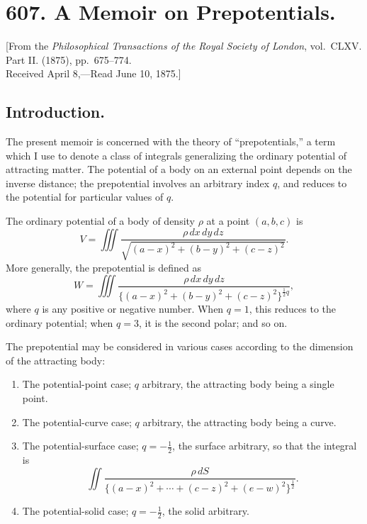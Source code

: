 \documentclass[11pt,a4paper]{book}
\begin{document}
\newpage
\section[A Memoir on Prepotentials]%
{607. A Memoir on Prepotentials.}

\begin{center}
{\small [From the \textit{Philosophical Transactions of the Royal Society of London}, vol.~CLXV. Part II. (1875), pp.~675--774.\\
Received April 8,---Read June 10, 1875.]}
\end{center}

\subsection*{Introduction.}

\begin{art}
The present memoir is concerned with the theory of ``prepotentials,'' a term which I use to denote a class of integrals generalizing the ordinary potential of attracting matter. The potential of a body on an external point depends on the inverse distance; the prepotential involves an arbitrary index $q$, and reduces to the potential for particular values of $q$.
\end{art}

\begin{art}
The ordinary potential of a body of density $\rho$ at a point $(a, b, c)$ is
\[
V = \iiint \frac{\rho\,dx\,dy\,dz}{\sqrt{(a-x)^2 + (b-y)^2 + (c-z)^2}}.
\]
More generally, the prepotential is defined as
\[
W = \iiint \frac{\rho\,dx\,dy\,dz}{\{(a-x)^2 + (b-y)^2 + (c-z)^2\}^{\frac{1}{2}q}},
\]
where $q$ is any positive or negative number. When $q=1$, this reduces to the ordinary potential; when $q=3$, it is the second polar; and so on.
\end{art}

\begin{art}
The prepotential may be considered in various cases according to the dimension of the attracting body:
\begin{enumerate}
\item[A.] The potential-point case; $q$ arbitrary, the attracting body being a single point.
\item[B.] The potential-curve case; $q$ arbitrary, the attracting body being a curve.
\item[C.] The potential-surface case; $q = -\frac{1}{2}$, the surface arbitrary, so that the integral is
\[
\iint \frac{\rho\,dS}{\{(a-x)^2 + \cdots + (c-z)^2 + (e-w)^2\}^{\frac{1}{2}}}.
\]
\item[D.] The potential-solid case; $q = -\frac{1}{2}$, the solid arbitrary.
\end{enumerate}
\end{art}
\end{document}
